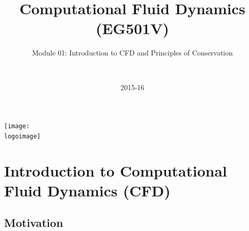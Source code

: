 \documentclass[10pt,compress,handout,ignorenonframetext]{beamer}
\institute{School of Engineering}
\title{Computational Fluid Dynamics (EG501V)}
\subtitle{Module 01: Introduction to CFD and Principles of Conservation}
\date[2015-16]{2015-16}
\author[\shortname]{%
  \fullname\\\ttfamily{\emailaddress}
}
\newcommand{\logoimage}{./FigBanner/UoAHorizBanner}
\begin{document}
\begin{frame}
  \titlepage
  \vfill%
  \begin{center}
    \texttt{[image: \\logoimage]}
  \end{center}
\end{frame}





\section{Introduction to Computational Fluid Dynamics (CFD)}


\subsection{Motivation}
\end{document}
